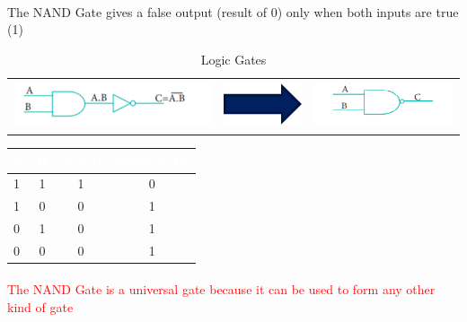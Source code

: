\documentclass{article}
\begin{document}
\paragraph{}
The NAND Gate gives a false output (result of 0) only when both inputs are true (1)
\newpage
\begin{table}[h!]
	\begin{center}
		\caption{Logic Gates}
		\label{tab:table1}
		\begin{tabular}{l c c}
			\includegraphics[width=0.25\linewidth]{nand1}
			&
			\includegraphics[width=0.13\linewidth]{arrow}
			&
			\includegraphics[width=0.25\linewidth]{nand2}
			\\
		\end{tabular}
	\end{center}
\end{table}

\begin{table}[h!]
	\begin{center}
		\begin{tabular}{ |l|c|c|c }
			\cellcolor{blue!100}\textcolor{white}{\textbf{    A    }} & \cellcolor{blue!100}\textcolor{white}{\textbf{    B    }} & \cellcolor{blue!100}\textcolor{white}{\textbf{A + B}} &
			\cellcolor{blue!100}\textcolor{white}{\textbf{C=(A + B)}}\\
			\hline
			1 & 1 & 1 & 0\\
			1 & 0 & 0 & 1\\
			0 & 1 & 0 & 1\\
			0 & 0 & 0 & 1\\
			\hline
			
		\end{tabular}
	\end{center}
\end{table}
\paragraph{}
\textcolor{red}{The NAND Gate is a universal gate because it can be used to form any other kind of gate }
\end{document}
